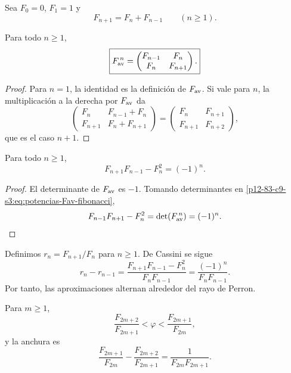 Sea \(F_0=0\), \(F_1=1\) y
\[
 F_{n+1}=F_n+F_{n-1}\qquad(n\geq1).
\]

\begin{theorem}
\label{p12-83-c9-s3:thm:potencias-fibonacci-phi}
Para todo \(n\geq1\),
\begin{equation}
 \boxed{
 F_{\rm av}^{\,n}=
 \begin{pmatrix}
 F_{n-1}&F_n\\
 F_n&F_{n+1}
 \end{pmatrix}.}
 \label{p12-83-c9-s3:eq:potencias-Fav-fibonacci}
\end{equation}
\end{theorem}

\begin{proof}
Para \(n=1\), la identidad es la definición de \(F_{\rm av}\). Si vale
para \(n\), la multiplicación a la derecha por \(F_{\rm av}\) da
\[
 \begin{pmatrix}
 F_n&F_{n-1}+F_n\\
 F_{n+1}&F_n+F_{n+1}
 \end{pmatrix}
 =
 \begin{pmatrix}
 F_n&F_{n+1}\\
 F_{n+1}&F_{n+2}
 \end{pmatrix},
\]
que es el caso \(n+1\).
\end{proof}

\begin{theorem}
\label{p12-83-c9-s3:thm:cassini-phi}
Para todo \(n\geq1\),
\begin{equation}
 \boxed{F_{n+1}F_{n-1}-F_n^2=(-1)^n.}
 \label{p12-83-c9-s3:eq:cassini-phi}
\end{equation}
\end{theorem}

\begin{proof}
El determinante de \(F_{\rm av}\) es \(-1\). Tomando determinantes en
\eqref{p12-83-c9-s3:eq:potencias-Fav-fibonacci},
\[
 F_{n-1}F_{n+1}-F_n^2
 =\det(F_{\rm av}^{\,n})=(-1)^n.
\]
\end{proof}

Definimos \(r_n=F_{n+1}/F_n\) para \(n\geq1\). De Cassini se sigue
\[
 r_n-r_{n-1}
 =\frac{F_{n+1}F_{n-1}-F_n^2}{F_nF_{n-1}}
 =\frac{(-1)^n}{F_nF_{n-1}}.
\]
Por tanto, las aproximaciones alternan alrededor del rayo de Perron.

\begin{proposition}
\label{p12-83-c9-s3:prop:horquillas-perron-phi}
Para \(m\geq1\),
\begin{equation}
 \frac{F_{2m+2}}{F_{2m+1}}
 <\varphi<
 \frac{F_{2m+1}}{F_{2m}},
 \label{p12-83-c9-s3:eq:horquilla-fibonacci-phi}
\end{equation}
y la anchura es
\begin{equation}
 \boxed{
 \frac{F_{2m+1}}{F_{2m}}
 -\frac{F_{2m+2}}{F_{2m+1}}
 =\frac{1}{F_{2m}F_{2m+1}}.}
 \label{p12-83-c9-s3:eq:anchura-fibonacci-phi}
\end{equation}
\end{proposition}

